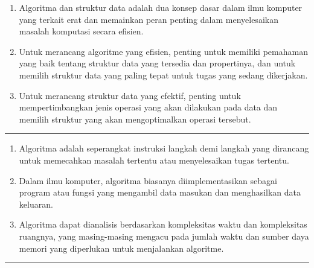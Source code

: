 \documentclass[12pt,preprintnumbers,amsmath,amssymb,nofootinbib,superscriptaddress]{revtex4-1}
\begin{document}
\begin{enumerate}
    \item Algoritma dan struktur data adalah dua konsep dasar dalam ilmu komputer yang terkait erat dan memainkan peran penting dalam menyelesaikan masalah komputasi secara efisien.
    \item Untuk merancang algoritme yang efisien, penting untuk memiliki pemahaman yang baik tentang struktur data yang tersedia dan propertinya, dan untuk memilih struktur data yang paling tepat untuk tugas yang sedang dikerjakan. 
    \item Untuk merancang struktur data yang efektif, penting untuk mempertimbangkan jenis operasi yang akan dilakukan pada data dan memilih struktur yang akan mengoptimalkan operasi tersebut.
\end{enumerate}

\vspace{1cm}

\newpage

\label{Ueff}
\vspace{-0.7cm}
\vspace{-0.2cm}\hrule

\vspace{2cm}

\begin{enumerate}
    \item Algoritma adalah seperangkat instruksi langkah demi langkah yang dirancang untuk memecahkan masalah tertentu atau menyelesaikan tugas tertentu. 
    \item Dalam ilmu komputer, algoritma biasanya diimplementasikan sebagai program atau fungsi yang mengambil data masukan dan menghasilkan data keluaran. 
    \item Algoritma dapat dianalisis berdasarkan kompleksitas waktu dan kompleksitas ruangnya, yang masing-masing mengacu pada jumlah waktu dan sumber daya memori yang diperlukan untuk menjalankan algoritme.
\end{enumerate}

\vspace{1cm}

\newpage

\label{Ueff}
\vspace{-0.7cm}
\vspace{-0.2cm}\hrule
\end{document}
